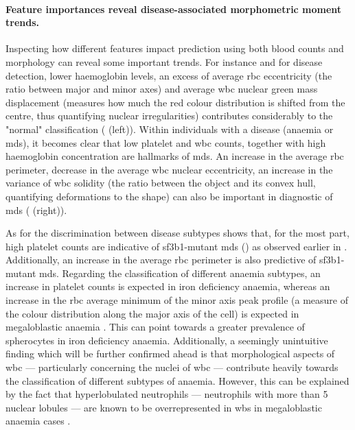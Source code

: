 \paragraph{Feature importances reveal disease-associated morphometric moment trends.} Inspecting how different features impact prediction using both blood counts and morphology can reveal some important trends. For instance and for disease detection, lower haemoglobin levels, an excess of average \ac{rbc} eccentricity (the ratio between major and minor axes) and average \ac{wbc} nuclear green mass displacement (measures how much the red colour distribution is shifted from the centre, thus quantifying nuclear irregularities) contributes considerably to the "normal" classification ( (left)). Within individuals with a disease (anaemia or \ac{mds}), it becomes clear that low platelet and \ac{wbc} counts, together with high haemoglobin concentration are hallmarks of \ac{mds}. An increase in the average \ac{rbc} perimeter, decrease in the average \ac{wbc} nuclear eccentricity, an increase in the variance of \ac{wbc} solidity (the ratio between the object and its convex hull, quantifying deformations to the shape) can also be important in diagnostic of \ac{mds} ( (right)).

\begin{figure}[!ht]
    \label{fig:feature-importance-disease-detection-classification}
\end{figure}

As for the discrimination between disease subtypes shows that, for the most part, high platelet counts are indicative of \ac{sf3b1}-mutant \ac{mds} () as observed earlier in . Additionally, an increase in the average \ac{rbc} perimeter is also predictive of \ac{sf3b1}-mutant \ac{mds}. Regarding the classification of different anaemia subtypes, an increase in platelet counts is expected in iron deficiency anaemia, whereas an increase in the \ac{rbc} average minimum of the minor axis peak profile (a measure of the colour distribution along the major axis of the cell) is expected in megaloblastic anaemia . This can point towards a greater prevalence of spherocytes in iron deficiency anaemia. Additionally, a seemingly unintuitive finding which will be further confirmed ahead is that morphological aspects of \ac{wbc} --- particularly concerning the nuclei of \ac{wbc} --- contribute heavily towards the classification of different subtypes of anaemia. However, this can be explained by the fact that hyperlobulated neutrophils --- neutrophils with more than 5 nuclear lobules --- are known to be overrepresented in \ac{wbs} in megaloblastic anaemia cases \cite{Hariz2021-qw}.

